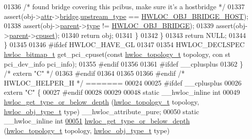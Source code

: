 \begin{DoxyCode}
{{01336       \textcolor{comment}{/* found bridge covering this pcibus, make sure it's a hostbridge */}
01337       assert(obj->\hyperlink{a00016_accd40e29f71f19e88db62ea3df02adc8}{attr}->\hyperlink{a00017_adbdf280699dd84c7619cd8d9edc0d958}{bridge}.\hyperlink{a00012_a265dd2164aa2df4972e25a029da72125}{upstream_type} == \hyperlink{a00041_gga48a4803c72574191d7ead1c62aaf9860a2c7660f3864ad2810c1e72aad285e574}{HWLOC_OBJ_BRIDGE_HOST});
01338       assert(obj->\hyperlink{a00016_adc494f6aed939992be1c55cca5822900}{parent}->\hyperlink{a00016_acc4f0803f244867e68fe0036800be5de}{type} != \hyperlink{a00041_ggacd37bb612667dc437d66bfb175a8dc55a6825f10895fea60aca7a6ba9fe273db0}{HWLOC_OBJ_BRIDGE});
01339       assert(obj->\hyperlink{a00016_adc494f6aed939992be1c55cca5822900}{parent}->\hyperlink{a00016_a67925e0f2c47f50408fbdb9bddd0790f}{cpuset});
01340       \textcolor{keywordflow}{return} obj;
01341     \}
01342   \}
01343   \textcolor{keywordflow}{return} NULL;
01344 \}
01345 
01346 \textcolor{preprocessor}{#ifdef HWLOC\_HAVE\_GL}
01347 \textcolor{preprocessor}{}
01354 HWLOC\_DECLSPEC \hyperlink{a00065_gaa3c2bf4c776d603dcebbb61b0c923d84}{hwloc_bitmap_t} get\_pci\_cpuset(\textcolor{keyword}{const} \hyperlink{a00039_ga9d1e76ee15a7dee158b786c30b6a6e38}{hwloc_topology_t} topology, \textcolor{keyword}{con
      st} pci\_dev\_info pci\_info);
01355 \textcolor{preprocessor}{#endif}
01356 \textcolor{preprocessor}{}
01361 \textcolor{preprocessor}{#ifdef \_\_cplusplus}
01362 \textcolor{preprocessor}{}\} \textcolor{comment}{/* extern "C" */}
01363 \textcolor{preprocessor}{#endif}
01364 \textcolor{preprocessor}{}
01365 
01366 \textcolor{preprocessor}{#endif }\textcolor{comment}{/* HWLOC\_HELPER\_H */}
=======
00024 
00025 \textcolor{preprocessor}{#ifdef \_\_cplusplus}
00026 \textcolor{preprocessor}{}\textcolor{keyword}{extern} \textcolor{stringliteral}{"C"} \{
00027 \textcolor{preprocessor}{#endif}
00028 \textcolor{preprocessor}{}
00029 
00048 \textcolor{keyword}{static} \_\_hwloc\_inline \textcolor{keywordtype}{int}
00049 \hyperlink{a00052_ga081be77905201e9f42318e9974456b45}{hwloc_get_type_or_below_depth} (\hyperlink{a00039_ga9d1e76ee15a7dee158b786c30b6a6e38}{hwloc_topology_t} topology, \hyperlink{a00041_gacd37bb612667dc437d66bfb175a8dc55}{hwloc_obj_type_t} type) 
      \_\_hwloc\_attribute\_pure;
00050 \textcolor{keyword}{static} \_\_hwloc\_inline \textcolor{keywordtype}{int}
\hypertarget{a00031_source_l00051}{}\hyperlink{a00052_ga081be77905201e9f42318e9974456b45}{00051} \hyperlink{a00052_ga081be77905201e9f42318e9974456b45}{hwloc_get_type_or_below_depth} (\hyperlink{a00039_ga9d1e76ee15a7dee158b786c30b6a6e38}{hwloc_topology_t} topology, \hyperlink{a00041_gacd37bb612667dc437d66bfb175a8dc55}{hwloc_obj_type_t} type)
}}
\end{DoxyCode}
